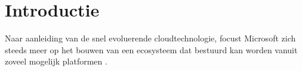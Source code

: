 
\section{Introductie}%
\label{sec:introductie}

\begin{comment}
Waarover zal je bachelorproef gaan? Introduceer het thema en zorg dat volgende zaken zeker duidelijk aanwezig zijn:

\begin{itemize}
  \item kaderen thema
  \item de doelgroep
  \item de probleemstelling en (centrale) onderzoeksvraag
  \item de onderzoeksdoelstelling
\end{itemize}

Denk er aan: een typische bachelorproef is \textit{toegepast onderzoek}, wat betekent dat je start vanuit een concrete probleemsituatie in bedrijfscontext, een \textbf{casus}. Het is belangrijk om je onderwerp goed af te bakenen: je gaat voor die \textit{ene specifieke probleemsituatie} op zoek naar een goede oplossing, op basis van de huidige kennis in het vakgebied.

De doelgroep moet ook concreet en duidelijk zijn, dus geen algemene of vaag gedefinieerde groepen zoals \emph{bedrijven}, \emph{developers}, \emph{Vlamingen}, enz. Je richt je in elk geval op it-professionals, een bachelorproef is geen populariserende tekst. Eén specifiek bedrijf (die te maken hebben met een concrete probleemsituatie) is dus beter dan \emph{bedrijven} in het algemeen.

Formuleer duidelijk de onderzoeksvraag! De begeleiders lezen nog steeds te veel voorstellen waarin we geen onderzoeksvraag terugvinden.

Schrijf ook iets over de doelstelling. Wat zie je als het concrete eindresultaat van je onderzoek, naast de uitgeschreven scriptie? Is het een proof-of-concept, een rapport met aanbevelingen, \ldots Met welk eindresultaat kan je je bachelorproef als een succes beschouwen?

\end{comment}

Naar aanleiding van de snel evoluerende cloudtechnologie, focust Microsoft zich steeds meer op het bouwen van een ecosysteem dat bestuurd kan worden vanuit zoveel mogelijk platformen \autocite{}.

